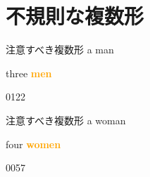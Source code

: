 \documentclass[aspectratio=169,xcolor={dvipsnames,table}]{beamer}
\newcommand{\myaudio}[1]{\href{#1}{\faVolumeUp}}
\begin{document}
\section{不規則な複数形}
\begin{frame}[plain]{注意すべき複数形}
\scalebox{5}{\ManFace}\hspace{15pt}
\pause
{\LARGE a man}\pause{}
\pause

\bigskip

\bigskip

\scalebox{5}{\ManFace\hspace{5pt}\ManFace\hspace{5pt}\ManFace}\hspace{15pt}
\pause
{\LARGE three  \textcolor{orange}{\bfseries men}}\pause{}

\bigskip

\bigskip

\mbox{}\hfill{\tiny 0122}\,{\scriptsize \myaudio{./audio/005_singular_plural_08.mp3}}
\end{frame}
\begin{frame}[plain]{注意すべき複数形}
\scalebox{5}{\WomanFace}\pause\hspace{15pt} {\LARGE a woman}%
\pause{}
\pause

\bigskip

\bigskip

\scalebox{5}{\WomanFace \WomanFace \WomanFace \WomanFace} \hspace{25pt}
\pause
{\LARGE four  \textcolor{orange}{\bfseries women}}%
\pause{}

\bigskip

\bigskip

\mbox{}\hfill{\tiny 0057}\,{\scriptsize \myaudio{./audio/005_singular_plural_09.mp3}}
\end{frame}
\end{document}

